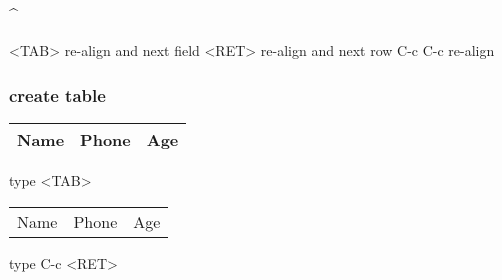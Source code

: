 \documentclass[11pt]{article}
\begin{document}
\subsubsection{\^{}}
\label{sec:orgc03304f}
<TAB> re-align and next field
<RET> re-align and next row
C-c C-c re-align
\subsubsection{create table}
\label{sec:orgd54618e}
\begin{center}
\begin{tabular}{lll}
Name & Phone & Age\\
\hline
\end{tabular}
\end{center}
type <TAB>

\begin{center}
\begin{tabular}{lll}
Name & Phone & Age\\
\end{tabular}
\end{center}
type C-c <RET>
\end{document}
